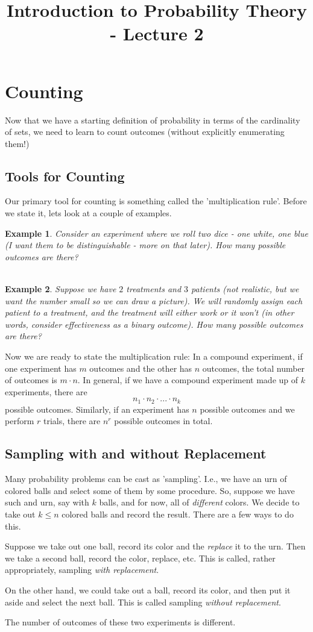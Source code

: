 \documentclass[12pt]{article} %
\title{Introduction to Probability Theory - Lecture 2}
\newtheorem{example}{Example}
\begin{document}
\maketitle
\section{Counting}
Now that we have a starting definition of probability in terms of the cardinality of sets, we need to learn to count outcomes (without explicitly enumerating them!)
\subsection{Tools for Counting}
Our primary tool for counting is something called the 'multiplication rule'. Before we state it, lets look at a couple of examples.
\begin{example}
Consider an experiment where we roll two dice - one white, one blue (I want them to be \emph{distinguishable} - more on that later). How many possible outcomes are there? \\\\

\end{example}
\begin{example}
Suppose we have $2$ treatments and $3$ patients (not realistic, but we want the number small so we can draw a picture). We will randomly assign each patient to a treatment, and the treatment will either work or it won't (in other words, consider effectiveness as a binary outcome). How many possible outcomes are there?
\end{example}
Now we are ready to state the multiplication rule: In a compound experiment, if one experiment has $m$ outcomes and the other has $n$ outcomes, the total number of outcomes is $m\cdot n$. In general, if we have a compound experiment made up of $k$ experiments, there are 
$$n_1\cdot n_2\cdot...\cdot n_k$$
possible outcomes. Similarly, if an experiment has $n$ possible outcomes and we perform $r$ trials, there are $n^r$ possible outcomes in total.
\subsection{Sampling with and without Replacement}
Many probability problems can be cast as 'sampling'. I.e., we have an urn of colored balls and select some of them by some procedure. So, suppose we have such and urn, say with $k$ balls, and for now, all of \emph{different} colors. We decide to take out $k\leq n$ colored balls and record the result. There are a few ways to do this.

Suppose we take out one ball, record its color and the \emph{replace} it to the urn. Then we take a second ball, record the color, replace, etc. This is called, rather appropriately, sampling \emph{with replacement}.

On the other hand, we could take out a ball, record its color, and then put it aside and select the next ball. This is called sampling \emph{without replacement}. 

The number of outcomes of these two experiments is different. 
\end{document}
